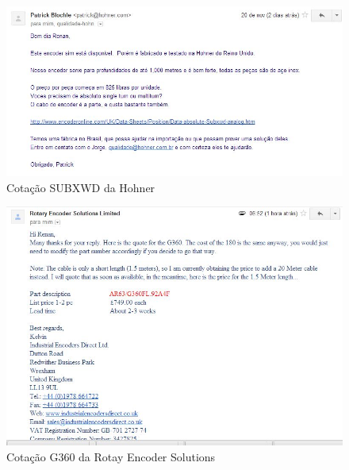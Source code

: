 
\begin{figure}[h!]
 \centering
 \includegraphics[width=1\columnwidth]{Encoder/price_quote_1}
 \caption{Cotação SUBXWD da Hohner}
\end{figure}

\begin{figure}[h!]
 \centering
 \includegraphics[width=1\columnwidth]{Encoder/price_quote_2}
 \caption{Cotação G360 da Rotay Encoder Solutions } 
\end{figure}